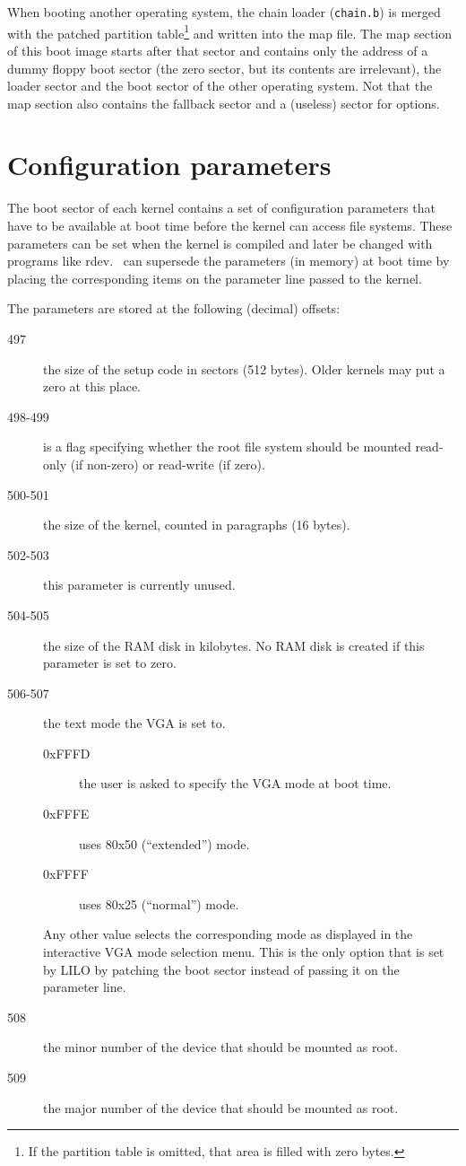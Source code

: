 When booting another operating system, the chain loader ({\tt chain.b}) is
merged with the patched partition table\footnote{If the partition table is
omitted, that area is filled with zero bytes.} and written into the map file.
The map section of this boot image starts after that sector and contains only
the address of a dummy floppy boot sector (the zero sector, but its
contents are irrelevant), the loader
sector and the boot sector of the other operating system. Not that the
map section also contains the fallback sector and a (useless) sector for
options.


\section{Configuration parameters}

The boot sector of each kernel contains a set of configuration parameters
that have to be available at boot time before the kernel can access
file systems. These parameters can be set when the kernel is compiled and
later be changed with programs like {\sf rdev}. \LILO\ can supersede
the parameters (in memory) at boot time by placing the corresponding
items on the parameter line passed to the kernel.

The parameters are stored at the following (decimal) offsets:

\begin{description}
  \item[497] the size of the setup code in sectors (512 bytes). Older kernels
    may put a zero at this place.
  \item[498-499] is a flag specifying whether the root file system should be
    mounted read-only (if non-zero) or read-write (if zero).
  \item[500-501] the size of the kernel, counted in paragraphs (16 bytes).
  \item[502-503] this parameter is currently unused.
  \item[504-505] the size of the RAM disk in kilobytes. No RAM disk is
    created if this parameter is set to zero.
  \item[506-507] the text mode the VGA is set to.
    \begin{description}
      \item[0xFFFD] the user is asked to specify the VGA mode at boot time.
      \item[0xFFFE] uses 80x50 (``extended'') mode.
      \item[0xFFFF] uses 80x25 (``normal'') mode.
    \end{description}
    Any other value selects the corresponding mode as displayed in the
    interactive VGA mode selection menu. This is the only option that is set
    by LILO by patching the boot sector instead of passing it on the parameter
    line.
  \item[508] the minor number of the device that should be mounted as root.
  \item[509] the major number of the device that should be mounted as root.
\end{description}


